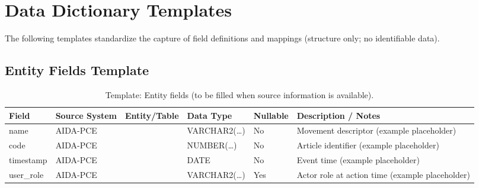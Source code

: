 \section{Data Dictionary Templates}
The following templates standardize the capture of field definitions and mappings (structure only; no identifiable data).

\subsection{Entity Fields Template}
\begin{table}[H]
    \centering
    \caption{Template: Entity fields (to be filled when source information is available).}
    \label{tab:template_entity_fields}
    {\setlength{\tabcolsep}{4pt}\small
    \begin{tabularx}{\textwidth}{@{}P{2.7cm} P{2.3cm} P{2.7cm} P{2.2cm} P{1.6cm} Y@{}}
        \toprule
        \textbf{Field} & \textbf{Source System} & \textbf{Entity/Table} & \textbf{Data Type} & \textbf{Nullable} & \textbf{Description / Notes} \\
        \midrule
        name & AIDA-PCE &  & VARCHAR2(\ldots) & No & Movement descriptor (example placeholder) \\
        code & AIDA-PCE &  & NUMBER(\ldots) & No & Article identifier (example placeholder) \\
        timestamp & AIDA-PCE &  & DATE & No & Event time (example placeholder) \\
        user\_role & AIDA-PCE &  & VARCHAR2(\ldots) & Yes & Actor role at action time (example placeholder) \\
        \bottomrule
    \end{tabularx}}
\end{table}

